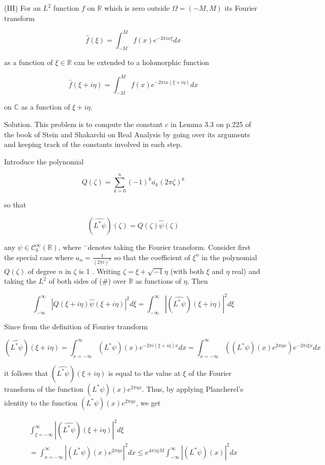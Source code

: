 \documentclass[10pt]{article}
\begin{document}
(III) For an $L^{2}$ function $f$ on $\mathbb{R}$ which is zero outside $\Omega=(-M, M)$ its Fourier transform

$$
\hat{f}(\xi)=\int_{-M}^{M} f(x) e^{-2 \pi i x \xi} d x
$$

as a function of $\xi \in \mathbb{R}$ can be extended to a holomorphic function

$$
\hat{f}(\xi+i \eta)=\int_{-M}^{M} f(x) e^{-2 \pi i x(\xi+i \eta)} d x
$$

on $\mathbb{C}$ as a function of $\xi+i \eta$.

Solution. This problem is to compute the constant $c$ in Lemma 3.3 on p.225 of the book of Stein and Shakarchi on Real Analysis by going over its arguments and keeping track of the constants involved in each step.

Introduce the polynomial

$$
Q(\zeta)=\sum_{k=0}^{n}(-1)^{k} \overline{a_{k}}(2 \pi \zeta)^{k}
$$

so that

$$
\left(\widehat{L^{*} \psi}\right)(\zeta)=Q(\zeta) \hat{\psi}(\zeta)
$$

any $\psi \in \mathcal{C}_{0}^{\infty}(\mathbb{R})$, where ${ }^{-}$denotes taking the Fourier transform. Consider first the special case where $a_{n}=\frac{1}{(2 \pi i)^{n}}$ so that the coefficient of $\xi^{n}$ in the polynomial $Q(\zeta)$ of degree $n$ in $\zeta$ is 1 . Writing $\zeta=\xi+\sqrt{-1} \eta$ (with both $\xi$ and $\eta$ real) and taking the $L^{2}$ of both sides of (\#) over $\mathbb{R}$ as functions of $\eta$. Then

$$
\int_{-\infty}^{\infty}|Q(\xi+i \eta) \hat{\psi}(\xi+i \eta)|^{2} d \xi=\int_{-\infty}^{\infty}\left|\left(\widehat{L^{*} \psi}\right)(\xi+i \eta)\right|^{2} d \xi
$$

Since from the definition of Fourier transform

$$
\left(\widehat{L^{*} \psi}\right)(\xi+i \eta)=\int_{x=-\infty}^{\infty}\left(L^{*} \psi\right)(x) e^{-2 \pi i(\xi+i \eta) x} d x=\int_{x=-\infty}^{\infty}\left(\left(L^{*} \psi\right)(x) e^{2 \pi \eta x}\right) e^{-2 \pi i \xi x} d x
$$

it follows that $\left(\widehat{L^{*} \psi}\right)(\xi+i \eta)$ is equal to the value at $\xi$ of the Fourier transform of the function $\left(L^{*} \psi\right)(x) e^{2 \pi \eta x}$. Thus, by applying Plancherel's identity to the function $\left(L^{*} \psi\right)(x) e^{2 \pi \eta x}$, we get

$$
\begin{gathered}
\int_{\xi=-\infty}^{\infty}\left|\left(\widehat{L^{*} \psi}\right)(\xi+i \eta)\right|^{2} d \xi \\
=\int_{x=-\infty}^{\infty}\left|\left(L^{*} \psi\right)(x) e^{2 \pi \eta x}\right|^{2} d x \leq e^{4 \pi|\eta| M} \int_{-\infty}^{\infty}\left|\left(L^{*} \psi\right)(x)\right|^{2} d x
\end{gathered}
$$
\end{document}
